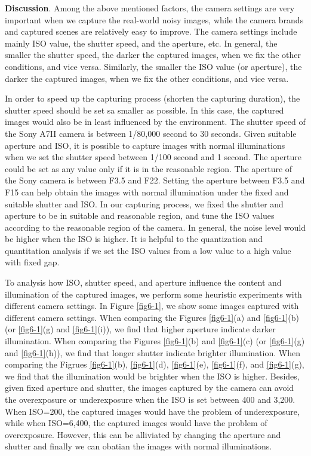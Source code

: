 \textbf{Discussion}. Among the above mentioned factors, the camera settings are very important when we capture the real-world noisy images, while the camera brands and captured scenes are relatively easy to improve. The camera settings include mainly ISO value, the shutter speed, and the aperture, etc. In general, the smaller the shutter speed, the darker the captured images, when we fix the other conditions, and vice versa. Similarly, the smaller the ISO value (or aperture), the darker the captured images, when we fix the other conditions, and vice versa. 

In order to speed up the capturing process (shorten the capturing duration), the shutter speed should be set sa smaller as possible. In this case, the captured images would also be in least influenced by the environment. The shutter speed of the Sony A7II camera is between 1/80,000 second to 30 seconds. Given suitable aperture and ISO, it is possible to capture images with normal illuminations when we set the shutter speed between 1/100 second and 1 second. The aperture could be set as any value only if it is in the reasonable region. The aperture of the Sony camera is between F3.5 and F22. Setting the aperture between F3.5 and F15 can help obtain the images with normal illumination under the fixed and suitable shutter and ISO. In our capturing process, we fixed the shutter and aperture to be in suitable and reasonable region, and tune the ISO values according to the reasonable region of the camera. In general, the noise level would be higher when the ISO is higher. It is helpful to the quantization and quantitation analysis if we set the ISO values from a low value to a high value with fixed gap.

To analysis how ISO, shutter speed, and aperture influence the content and illumination of the captured images, we perform some heuristic experiments with different camera settings. In Figure \ref{fig6-1}, we show some images captured with different camera settings. When comparing the Figures \ref{fig6-1}(a) and \ref{fig6-1}(b) (or \ref{fig6-1}(g) and \ref{fig6-1}(i)), we find that higher aperture indicate darker illumination. When comparing the Figures \ref{fig6-1}(b) and \ref{fig6-1}(c) (or \ref{fig6-1}(g) and \ref{fig6-1}(h)), we find that longer shutter indicate brighter illumination. When comparing the Figrues \ref{fig6-1}(b), \ref{fig6-1}(d), \ref{fig6-1}(e), \ref{fig6-1}(f), and \ref{fig6-1}(g), we find that the illumination would be brighter when the ISO is higher. Besides, given fixed aperture and shutter, the images captured by the camera can avoid the overexposure or underexposure when the ISO is set between 400 and 3,200.  When ISO=200, the captured images would have the problem of underexposure, while when ISO=6,400, the captured images would have the problem of overexposure. However, this can be alliviated by changing the aperture and shutter and finally we can obatian the images with normal illuminations.


